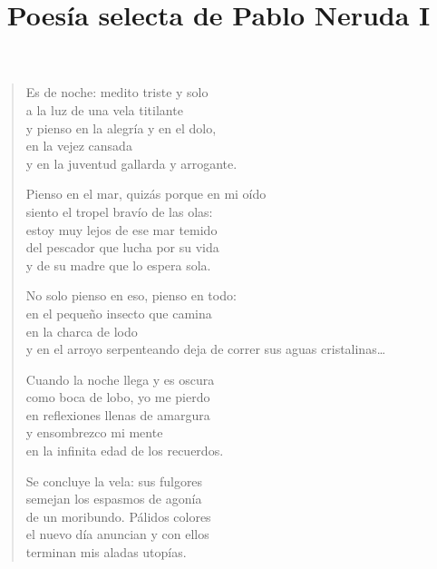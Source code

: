 \documentclass[12pt]{article}
\date{}
\title{Poesía selecta de Pablo Neruda I}
\begin{document}
\maketitle
\tableofcontents
\clearpage
{}
\begin{verse}

Es de noche: medito triste y solo\\
a la luz de una vela titilante\\
y pienso en la alegría y en el dolo,\\
en la vejez cansada\\
y en la juventud gallarda y arrogante.  

Pienso en el mar, quizás porque en mi oído\\
siento el tropel bravío de las olas:\\
estoy muy lejos de ese mar temido\\
del pescador que lucha por su vida\\
y de su madre que lo espera sola.  

No solo pienso en eso, pienso en todo:\\
en el pequeño insecto que camina\\
en la charca de lodo\\
y en el arroyo serpenteando deja de correr sus aguas cristalinas\ldots{}  

Cuando la noche llega y es oscura\\
como boca de lobo, yo me pierdo\\
en reflexiones llenas de amargura\\
y ensombrezco mi mente\\
en la infinita edad de los recuerdos.  

Se concluye la vela: sus fulgores\\
semejan los espasmos de agonía\\
de un moribundo. Pálidos colores\\
el nuevo día anuncian y con ellos\\
terminan mis aladas utopías.

\end{verse}
\end{document}
